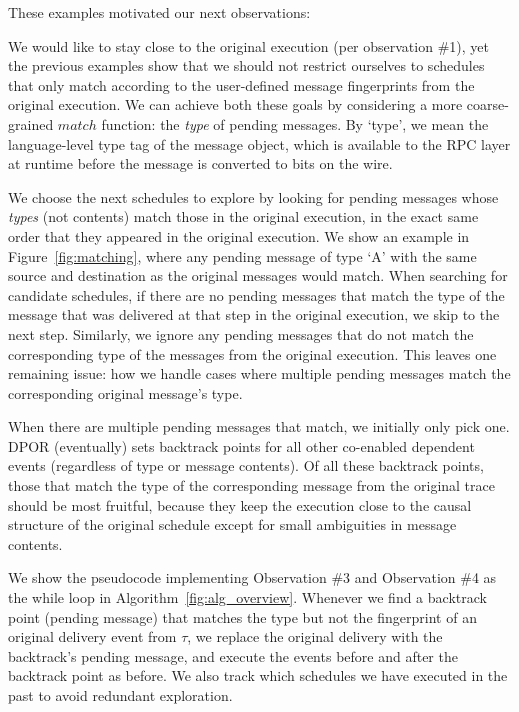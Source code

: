 These examples motivated our next observations:

 We would like to
stay close to the original execution (per observation \#1), yet the previous
examples show that we should not restrict ourselves to schedules that only
match according to the user-defined message fingerprints from the original execution. We
can achieve both these goals by considering a more coarse-grained $match$
function: the {\em type} of pending messages. By `type', we mean the
language-level type tag of the message object, which is
available to the RPC layer at runtime before the message is converted to bits on the wire.

We choose the next schedules to explore by looking for pending messages whose
{\em types} (not contents) match those in the original execution, in the exact same order
that they appeared in the original execution. We show an example in
Figure~\ref{fig:matching}, where any pending message of type `A' with the same
source and destination as the original messages would match. When searching for candidate schedules, if there
are no pending messages that match the type of the message that was delivered
at that step in the original execution, we skip to the next step.
Similarly, we
ignore any pending messages that do not match the corresponding type of the
messages from the original
execution. This leaves one remaining issue: how we handle cases where multiple
pending messages match the corresponding original message's type.

 When there are multiple pending messages that match,
we initially only pick one. DPOR (eventually) sets backtrack points for all other co-enabled
dependent events (regardless of type or message contents).
Of all these backtrack points, those that match the type of the corresponding message
from the original trace should be most fruitful, because they keep the execution close to the causal structure of the
original schedule except for small ambiguities in message contents.

We show the pseudocode implementing Observation \#3 and Observation \#4 as the while loop in Algorithm~\ref{fig:alg_overview}.
Whenever we find a backtrack point (pending message) that matches the type but not the
fingerprint of an original delivery event from $\tau$, we replace the original
delivery with the backtrack's pending message, and execute the events before
and after the backtrack point as before. We also track which schedules we have executed in the past
to avoid redundant exploration.

